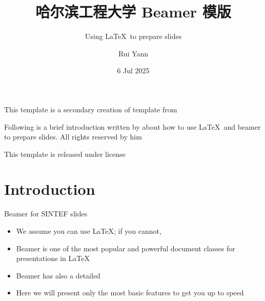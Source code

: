 \documentclass{beamer}
\title{哈尔滨工程大学 Beamer 模版}
\subtitle{Using \LaTeX\ to prepare slides}
\author{Rui Yann}
\date{6 Jul 2025}
\begin{document}
    
    \maketitle
    
    \begin{frame}
        This template is a secondary creation of  template from  \vspace{\baselineskip}
        
        Following is a brief introduction written by  about how to use \LaTeX\ and beamer to prepare slides. All rights reserved by him\vspace{\baselineskip}
        
        This template is released under  license
    \end{frame}
    
    \section{Introduction}
    
    \begin{frame}{Beamer for SINTEF slides}{\thesection \, \secname}
        \begin{itemize}
            \item We assume you can use \LaTeX; if you cannot, 
            \item Beamer is one of the most popular and powerful document classes for presentations in \LaTeX
            \item Beamer has also a detailed 
            \item Here we will present only the most basic features to get you up to speed
        \end{itemize}
    \end{frame}
    
\end{document}
